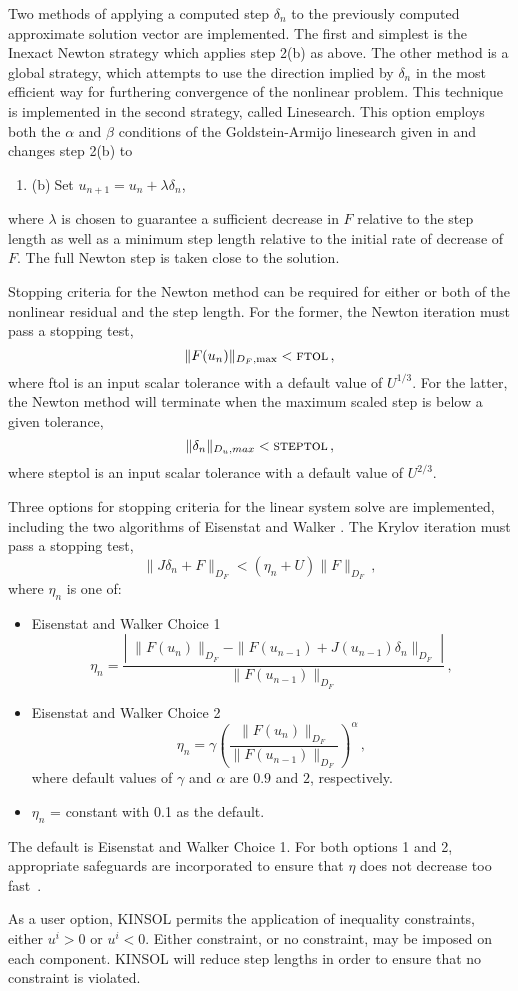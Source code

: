 Two methods of applying a computed step $\delta_n$ to the previously computed
approximate solution vector are implemented.  The 
first and simplest is the Inexact Newton strategy which applies step 2(b) 
as above.  
The other method is a global strategy,
which attempts to use the direction implied by $\delta_n$ 
in the most efficient way for furthering convergence of the nonlinear problem. 
This technique 
is implemented in the second strategy, called Linesearch.  This option
employs both the $\alpha$ and $\beta$ conditions of the Goldstein-Armijo
linesearch given in \cite{DeSc:96} and changes step 2(b) to
\begin{enumerate}
  \addtocounter{enumi}{1}
\item{(b)$\;$Set $u_{n+1} = u_n + \lambda \delta_n$},
\end{enumerate}
where $\lambda$ is chosen to guarantee a sufficient decrease in $F$ 
relative to the step length as well as a minimum step length relative 
to the initial rate of decrease of $F$.  The full Newton step is taken
close to the solution.

Stopping criteria for the Newton method can be required for either or 
both of the nonlinear residual and the step length.  For the former, 
the Newton iteration must pass a stopping test,
\[ \|F(u_n)\|_{D_F,\mbox{\scriptsize max}} < \mbox{\sc ftol} \, , \]
where {\sc ftol} is an input scalar tolerance with a default value of
$U^{1/3}$. 
For the latter, the Newton method will terminate when the maximum scaled step
is below a given tolerance,
\[ \|\delta_n\|_{D_u,max} < \mbox{\sc steptol} \, , \]
where {\sc steptol} is an input scalar tolerance with a default value of 
$U^{2/3}$.

Three options for stopping criteria for the linear system solve are
implemented, including the two 
algorithms of Eisenstat and Walker \cite{EiWa:96}.
The Krylov iteration must pass a stopping test,
\[ \|J \delta_n + F\|_{D_F} < (\eta_n + U) \|F\|_{D_F} \, , \]
where $\eta_n$ is one of:
\begin{itemize}
\item Eisenstat and Walker Choice 1
  \[ 
  \eta_n = \frac{\left|\; \|F(u_n)\|_{D_F}  
      - \|F(u_{n-1}) + J(u_{n-1}) \delta_n \|_{D_F} 
      \; \right|}
  {\|F(u_{n-1})\|_{D_F}} \, ,  
  \]
\item Eisenstat and Walker Choice 2
  \[ 
  \eta_n = \gamma 
  \left( \frac{ \|F(u_n)\|_{D_F}}{\|F(u_{n-1})\|_{D_F}} \right)^{\alpha} \, ,
  \] 
where default values of $\gamma$ and $\alpha$ are $0.9$ and $2$,
 respectively. 
\item  $\eta_n$ = constant with 0.1 as the default.
\end{itemize}
The default is Eisenstat and Walker Choice 1. For both options 1 and 2, 
appropriate safeguards are incorporated to ensure that $\eta$ does not 
decrease too fast~\cite{EiWa:96}.

As a user option, KINSOL permits the application of inequality
constraints, either $u^i > 0$ or $u^i < 0$.  Either constraint, or
no constraint, may be imposed on each component.  KINSOL will reduce 
step lengths in order to ensure that no constraint is violated.


